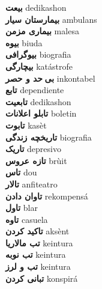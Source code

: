 \textbf{ بیعت  } dedikashon \\
\textbf{ بیمارستان سیار  } ambulans \\
\textbf{ بیماری مزمن  } malesa \\
\textbf{ بیوه  } biuda \\
\textbf{ بیوگرافی  } biografia \\
\textbf{ بیچارگی  } katástrofe \\
\textbf{ بی حد و حصر  } inkontabel \\
\textbf{ تابع  } dependiente \\
\textbf{ تابعیت  } dedikashon \\
\textbf{ تابلو اعلانات  } boletin \\
\textbf{ تابوت  } kasèt \\
\textbf{ تاریخچه زندگی  } biografia \\
\textbf{ تاریک  } depresivo \\
\textbf{ تازه عروس  } brùit \\
\textbf{ تاس  } dou \\
\textbf{ تالار  } anfiteatro \\
\textbf{ تاوان دادن  } rekompensá \\
\textbf{ تاول  } blar \\
\textbf{ تاوه  } casuela \\
\textbf{ تاکید کردن  } aksènt \\
\textbf{ تب مالاریا  } keintura \\
\textbf{ تب نوبه  } keintura \\
\textbf{ تب و لرز  } keintura \\
\textbf{ تبانی کردن  } konspirá \\
